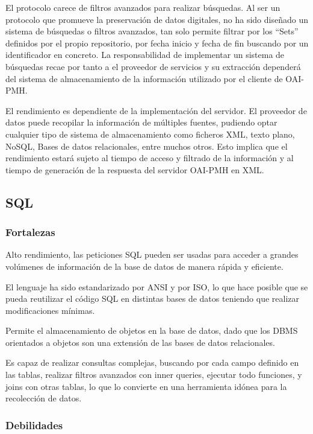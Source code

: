 El protocolo carece de filtros avanzados para realizar búsquedas. Al ser un protocolo que promueve la preservación de datos digitales, no ha sido diseñado un sistema de búsquedas o filtros avanzados, tan solo permite filtrar por los “Sets” definidos por el propio repositorio, por fecha inicio y fecha de fin buscando por un identificador en concreto. La responsabilidad de implementar un sistema de búsquedas recae por tanto a el proveedor de servicios y su extracción dependerá del sistema de almacenamiento de la información utilizado por el cliente de OAI-PMH.

El rendimiento es dependiente de la implementación del servidor. El proveedor de datos puede recopilar la información de múltiples fuentes, pudiendo optar cualquier tipo de sistema de almacenamiento como ficheros XML, texto plano, NoSQL, Bases de datos relacionales, entre muchos otros. Esto implica que el rendimiento estará sujeto al tiempo de acceso y filtrado de la información y al tiempo de generación de la respuesta del servidor OAI-PMH en XML.

\subsection{SQL}

\subsubsection{Fortalezas}
Alto rendimiento, las peticiones SQL pueden ser usadas para acceder a grandes volúmenes de información de la base de datos de manera rápida y eficiente.

El lenguaje ha sido estandarizado por ANSI y por ISO, lo que hace posible que se pueda reutilizar el código SQL en distintas bases de datos teniendo que realizar modificaciones mínimas.

Permite el almacenamiento de objetos en la base de datos, dado que los DBMS orientados a objetos son una extensión de las bases de datos relacionales.

Es capaz de realizar consultas complejas, buscando por cada campo definido en las tablas, realizar filtros avanzados con inner queries, ejecutar todo funciones, y joins con otras tablas, lo que lo convierte en una herramienta idónea para la recolección de datos.

\subsubsection{Debilidades}

